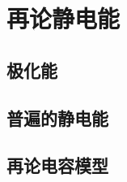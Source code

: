 

\section{再论静电能}\label{16-4}

\subsection{极化能}\label{16-4-1}

\subsection{普遍的静电能}\label{16-4-2}

\subsection{再论电容模型}\label{16-4-3}
